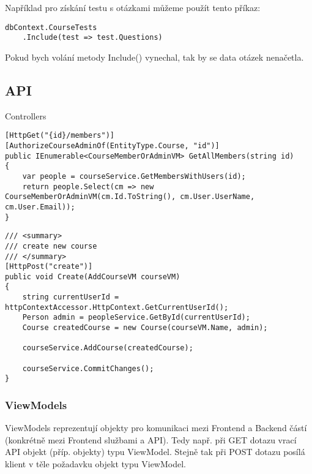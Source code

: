 Například pro získání testu s otázkami můžeme použít tento příkaz:
\begin{lstlisting}
dbContext.CourseTests
	.Include(test => test.Questions)
\end{lstlisting}
Pokud bych volání metody Include() vynechal, tak by se data otázek nenačetla.

\newpage

\subsection{API}

Controllers

\begin{lstlisting}
[HttpGet("{id}/members")]
[AuthorizeCourseAdminOf(EntityType.Course, "id")]
public IEnumerable<CourseMemberOrAdminVM> GetAllMembers(string id)
{
	var people = courseService.GetMembersWithUsers(id);
	return people.Select(cm => new CourseMemberOrAdminVM(cm.Id.ToString(), cm.User.UserName, cm.User.Email));
}
\end{lstlisting}

\begin{lstlisting}
/// <summary>
/// create new course
/// </summary>
[HttpPost("create")]
public void Create(AddCourseVM courseVM)
{
	string currentUserId = httpContextAccessor.HttpContext.GetCurrentUserId();
	Person admin = peopleService.GetById(currentUserId);
	Course createdCourse = new Course(courseVM.Name, admin);
	
	courseService.AddCourse(createdCourse);
	
	courseService.CommitChanges();
}
\end{lstlisting}

\subsubsection*{ViewModels}

ViewModels reprezentují objekty pro komunikaci mezi Frontend a Backend částí (konkrétně mezi Frontend službami a API). Tedy např. při GET dotazu vrací API objekt (příp. objekty) typu ViewModel. Stejně tak při POST dotazu posílá klient v těle požadavku objekt typu ViewModel.

